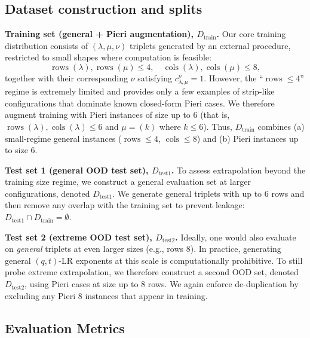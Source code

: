 \documentclass{article}
\theoremstyle{plain}
\theoremstyle{definition}
\theoremstyle{remark}
\newcommand\rows{\operatorname{rows}}
\newcommand\cols{\operatorname{cols}}
\begin{document}

\subsection{Dataset construction and splits}
\label{sec:dataset_setup}

\textbf{Training set (general + Pieri augmentation), $D_{\text{train}}$.}
Our core training distribution consists of $(\lambda,\mu,\nu)$ triplets generated by an external procedure, restricted to small shapes where computation is feasible:
\[
    \rows(\lambda),\rows(\mu) \le 4,\quad \cols(\lambda),\cols(\mu) \le 8,
\]
together with their corresponding $\nu$ satisfying $c^\nu_{\lambda,\mu}=1$.
However, the ``$\rows \le 4$'' regime is extremely limited and provides only a few examples of strip-like configurations that dominate known closed-form Pieri cases.
We therefore augment training with Pieri instances of size up to 6 (that is, $\rows(\lambda),\cols(\lambda)\le 6$ and $\mu=(k)$ where $k\le 6$).
Thus, $D_{\text{train}}$ combines (a) small-regime general instances ($\rows \le 4$, $\cols \le 8$) and (b) Pieri instances up to size 6.

\textbf{Test set 1 (general OOD test set), $D_{\text{test1}}$.}
To assess extrapolation beyond the training size regime, we construct a general evaluation set at larger configurations, denoted $D_{\text{test1}}$.
We generate general triplets with up to 6 rows and then remove any overlap with the training set to prevent leakage:
\( D_{\text{test1}} \cap D_{\text{train}} = \emptyset. \)

\textbf{Test set 2 (extreme OOD test set), $D_{\text{test2}}$.}
Ideally, one would also evaluate on \emph{general} triplets at even larger sizes (e.g., rows 8). 
In practice, generating general $(q,t)$-LR exponents at this scale is computationally prohibitive.
To still probe extreme extrapolation, we therefore construct a second OOD set, denoted $D_{\text{test2}}$, using Pieri cases at size up to 8 rows.
We again enforce de-duplication by excluding any Pieri 8 instances that appear in training.

\subsection{Evaluation Metrics}
\label{sec:metrics}
\end{document}

